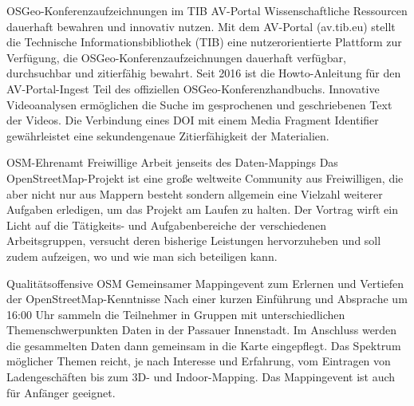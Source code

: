 %
{OSGeo-Konferenzaufzeichnungen im TIB AV-Portal\vspace{0.2\baselineskip}}%
{Wissenschaftliche Ressourcen dauerhaft bewahren und innovativ nutzen.}%
{Mit dem AV-Portal (av.tib.eu) stellt die Technische Informationsbibliothek (TIB) eine
nutzerorientierte Plattform zur Verfügung, die OSGeo-Konferenzaufzeichnungen dauerhaft verfügbar,
durchsuchbar und zitierfähig bewahrt. Seit 2016 ist die Howto-Anleitung für den AV-Portal-Ingest
Teil des offiziellen OSGeo-Konferenzhandbuchs. Innovative  Videoanalysen ermöglichen die Suche im
gesprochenen und geschriebenen Text der Videos. Die Verbindung eines DOI mit einem Media Fragment
Identifier gewährleistet eine sekundengenaue Zitierfähigkeit der Materialien.}



%
{OSM-Ehrenamt}%
{Freiwillige Arbeit jenseits des Daten-Mappings}%
{Das OpenStreetMap-Projekt ist eine große weltweite Community aus
Freiwilligen, die aber nicht nur aus Mappern besteht sondern allgemein
eine Vielzahl weiterer Aufgaben erledigen, um das
Projekt am Laufen zu halten. Der Vortrag wirft ein Licht auf die
Tätigkeits- und Aufgabenbereiche der verschiedenen Arbeitsgruppen,
versucht deren bisherige Leistungen hervorzuheben und soll zudem
aufzeigen, wo und wie man sich beteiligen kann.}

\abstractDreizehn{}%
{Qualitätsoffensive OSM}%
{Gemeinsamer Mappingevent zum Erlernen und Vertiefen der OpenStreetMap-Kenntnisse}%
{Nach einer kurzen Einführung und Absprache um 16:00 Uhr sammeln die Teilnehmer in Gruppen
mit unterschiedlichen Themenschwerpunkten Daten in der Passauer Innenstadt. Im Anschluss
werden die gesammelten Daten dann gemeinsam in die Karte eingepflegt.
Das Spektrum möglicher Themen reicht, je nach Interesse und Erfahrung, vom Eintragen von
Ladengeschäften bis zum 3D- und Indoor-Mapping. Das Mappingevent ist auch für Anfänger geeignet.}


\vfill

\vfill



\vfill


